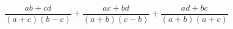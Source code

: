 \begin{ex}[type=expression]
	\begin{condition}
		\( \dfrac{ab+cd}{(a+c)(b-c)}+\dfrac{ac+bd}{(a+b)(c-b)}+\dfrac{ad+bc}{(a+b)(a+c)} \)
	\end{condition}
\end{ex}